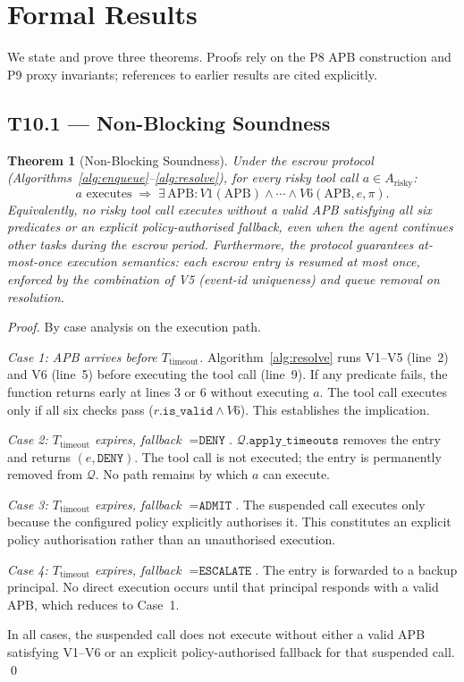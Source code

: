 \documentclass[11pt]{article}
\newtheorem{theorem}{Theorem}[section]
\newcommand{\DENY}{\texttt{DENY}}
\newcommand{\ADMIT}{\texttt{ADMIT}}
\newcommand{\ESCALATE}{\texttt{ESCALATE}}
\newcommand{\APB}{\mathrm{APB}}
\newcommand{\Ttimeout}{T_{\mathrm{timeout}}}
\newcommand{\Queue}{\mathcal{Q}}
\begin{document}
\section{Formal Results}
\label{sec:theory}

We state and prove three theorems. Proofs rely on the P8 APB
construction and P9 proxy invariants; references to earlier results
are cited explicitly.

\subsection{T10.1 --- Non-Blocking Soundness}

\begin{theorem}[Non-Blocking Soundness]
\label{thm:soundness}
Under the escrow protocol (Algorithms~\ref{alg:enqueue}--\ref{alg:resolve}),
for every risky tool call $a \in A_{\mathrm{risky}}$:
\[
  a \text{ executes}
  \;\Longrightarrow\;
  \exists\,\APB : V1(\APB) \land \cdots \land V6(\APB, e, \pi).
\]
Equivalently, no risky tool call executes without a valid APB satisfying
all six predicates or an explicit policy-authorised fallback, even when
the agent continues other tasks during the escrow period.
Furthermore, the protocol guarantees \emph{at-most-once} execution
semantics: each escrow entry is resumed at most once, enforced by the
combination of V5 (event-id uniqueness) and queue removal on
resolution.
\end{theorem}

\begin{proof}
By case analysis on the execution path.

\emph{Case 1: APB arrives before $\Ttimeout$.}
Algorithm~\ref{alg:resolve} runs V1--V5 (line~2) and V6 (line~5)
before executing the tool call (line~9). If any predicate fails, the
function returns early at lines 3 or 6 without executing $a$. The
tool call executes only if all six checks pass ($r.\mathtt{is\_valid}
\land V6$). This establishes the implication.

\emph{Case 2: $\Ttimeout$ expires, fallback $= \DENY$.}
$\Queue.\mathtt{apply\_timeouts}$ removes the entry and returns
$(e, \DENY)$. The tool call is not executed; the entry is permanently
removed from $\Queue$. No path remains by which $a$ can execute.

\emph{Case 3: $\Ttimeout$ expires, fallback $= \ADMIT$.}
The suspended call executes only because the configured policy
explicitly authorises it. This constitutes an explicit policy
authorisation rather than an unauthorised execution.

\emph{Case 4: $\Ttimeout$ expires, fallback $= \ESCALATE$.}
The entry is forwarded to a backup principal. No direct execution
occurs until that principal responds with a valid APB, which reduces
to Case~1.

In all cases, the suspended call does not execute without either
a valid APB satisfying V1--V6 or an explicit policy-authorised
fallback for that suspended call.
\qed
\end{proof}
\end{document}
